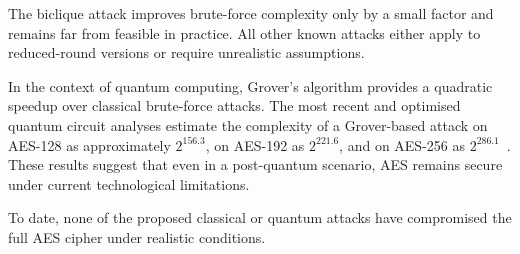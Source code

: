 The biclique attack improves brute-force complexity only by a small factor and remains far from feasible in practice. 
All other known attacks either apply to reduced-round versions or require unrealistic assumptions.\newline

\noindent In the context of quantum computing, Grover’s algorithm provides a quadratic speedup over classical brute-force attacks. 
The most recent and optimised quantum circuit analyses estimate the complexity of a Grover-based attack on AES-128 as approximately $2^{156.3}$, 
on AES-192 as $2^{221.6}$, and on AES-256 as $2^{286.1}$~\cite{Jang2025}. 
These results suggest that even in a post-quantum scenario, 
AES remains secure under current technological limitations.\newline

\noindent To date, none of the proposed classical or quantum attacks have compromised the full AES cipher under realistic conditions.